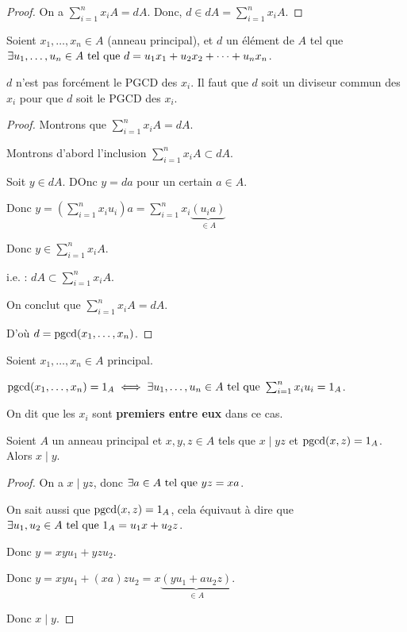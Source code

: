 \documentclass[12pt, a4paper]{report}
\begin{document}
\begin{proof}
    On a $\sum_{i=1}^{n}x_iA = dA$. Donc, $d\in dA = \sum_{i=1}^{n}x_iA$. 
\end{proof}

\begin{property}
    Soient $x_1,\dots,x_n \in A$ (anneau principal), et $d$ un élément de $A$ tel que $\exists u_1,\dots,u_n \in A \text{ tel que } d = u_1 x_1 + u_2 x_2 + \dots + u_n x_n$.

    $d$ n'est pas forcément le PGCD des $x_i$. Il faut que $d$ soit un diviseur commun des $x_i$ pour que $d$ soit le PGCD des $x_i$.
    
\end{property}

\begin{proof}
    Montrons que $\sum_{i=1}^{n}x_iA = dA$.

    Montrons d'abord l'inclusion $\sum_{i=1}^{n}x_iA \subset dA$.

    Soit $y\in dA$. DOnc $y=da$ pour un certain $a\in A$.

    Donc $y = (\sum_{i=1}^{n}x_iu_i)a=\sum_{i=1}^{n}x_i\underbrace{(u_i a)}_{\in A}$

    Donc $y \in \sum_{i=1}^{n}x_iA$.

    i.e. : $dA \subset \sum_{i=1}^{n}x_i A$.

    On conclut que $\sum_{i=1}^{n}x_iA = dA$.

    D'où $d=\mathrm{pgcd}(x_1,\dots,x_n)$.
\end{proof}

\begin{consequence}
    Soient $x_1,\dots,x_n \in A$ principal.

    $\mathrm{pgcd}(x_1,\dots,x_n)=1_A \iff \exists u_1,\dots,u_n \in A \text{ tel que } \sum_{i=1}^{n}x_iu_i=1_A$.

    On dit que les $x_i$ sont \textbf{premiers entre eux} dans ce cas.
\end{consequence}

\begin{theorem}
    Soient $A$ un anneau principal et $x,y,z \in A$ tels que $x \mid yz$ et $\mathrm{pgcd}(x,z)=1_A$. Alors $x \mid y$.
    
\end{theorem}

\begin{proof}
    On a $x\mid yz$, donc $\exists a \in A \text{ tel que } yz = xa$.

    On sait aussi que $\mathrm{pgcd}(x,z)=1_A$, cela équivaut à dire que $\exists u_1,u_2 \in A \text{ tel que } 1_A = u_1 x + u_2 z$.

    Donc $y= xyu_1+yzu_2$.

    Donc $y= xyu_1 + (xa)zu_2 = x\underbrace{(yu_1 + au_2 z)}_{\in A}$.
    
    Donc $x \mid y$.
\end{proof}
\end{document}
